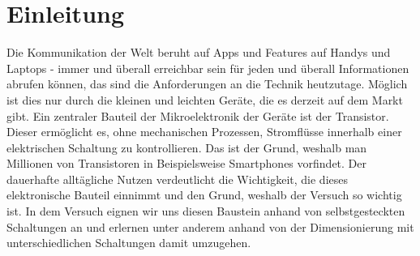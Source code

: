 

\chapter{Einleitung}
\label{chap:einleitung}

Die Kommunikation der Welt beruht auf Apps und Features auf Handys und Laptops - immer und überall erreichbar sein für jeden und überall Informationen abrufen können, das sind die Anforderungen an die Technik heutzutage. Möglich ist dies nur durch die kleinen und leichten Geräte, die es derzeit auf dem Markt gibt. Ein zentraler Bauteil der Mikroelektronik der Geräte ist der Transistor. Dieser ermöglicht es, ohne mechanischen Prozessen, Stromflüsse innerhalb einer elektrischen Schaltung zu kontrollieren. Das ist der Grund, weshalb man Millionen von Transistoren in Beispielsweise Smartphones vorfindet. Der dauerhafte alltägliche Nutzen verdeutlicht die Wichtigkeit, die dieses elektronische Bauteil einnimmt und den Grund, weshalb der Versuch so wichtig ist. In dem Versuch eignen wir uns diesen Baustein anhand von selbstgesteckten Schaltungen an und erlernen unter anderem anhand von der Dimensionierung mit unterschiedlichen Schaltungen damit umzugehen. 